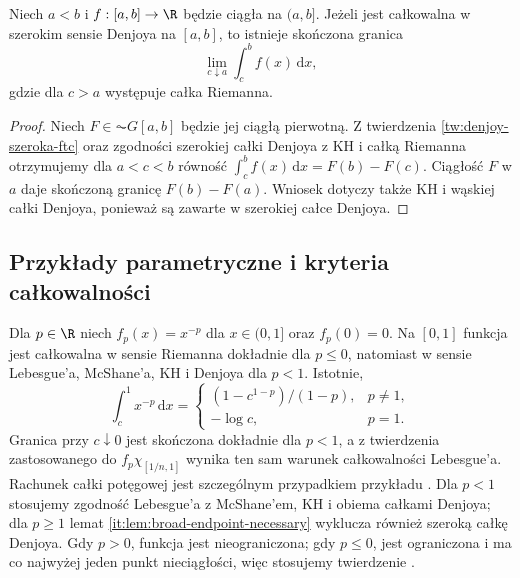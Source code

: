 \begin{lemat}\label{it:lem:broad-endpoint-necessary}
Niech $a<b$ i $f:[a,b]\to\R$ będzie ciągła na $(a,b]$. Jeżeli jest całkowalna w szerokim sensie Denjoya na $[a,b]$, to istnieje skończona granica
\[
 \lim_{c\downarrow a}\int_c^b f(x)\,\mathrm dx,
\]
gdzie dla $c>a$ występuje całka Riemanna.
\end{lemat}
\begin{proof}
Niech $F\in\AC G[a,b]$ będzie jej ciągłą pierwotną. Z twierdzenia \ref{tw:denjoy-szeroka-ftc} oraz zgodności szerokiej całki Denjoya z KH i całką Riemanna otrzymujemy dla $a<c<b$ równość $\int_c^b f(x)\,\mathrm dx=F(b)-F(c)$. Ciągłość $F$ w $a$ daje skończoną granicę $F(b)-F(a)$. Wniosek dotyczy także KH i wąskiej całki Denjoya, ponieważ są zawarte w szerokiej całce Denjoya.
\end{proof}
\subsection{Przykłady parametryczne i kryteria całkowalności}
\begin{przyklad}\label{ma1:kh:ex:positive-power}
Dla $p\in\R$ niech $f_p(x)=x^{-p}$ dla $x\in(0,1]$
oraz $f_p(0)=0$. Na $[0,1]$ funkcja jest całkowalna w sensie Riemanna dokładnie dla $p\le0$, natomiast w sensie Lebesgue'a, McShane'a, KH i Denjoya dla $p<1$. Istotnie,
\[
\int_c^1x^{-p}\,\mathrm dx=\begin{cases}(1-c^{1-p})/(1-p),&p\ne1,\\-\log c,&p=1.\end{cases}
\]
Granica przy $c\downarrow0$ jest skończona dokładnie dla $p<1$, a z twierdzenia  zastosowanego do $f_p\chi_{[1/n,1]}$ wynika ten sam warunek całkowalności Lebesgue'a. Rachunek całki potęgowej jest szczególnym przypadkiem przykładu . Dla $p<1$ stosujemy zgodność Lebesgue'a z McShane'em, KH i obiema całkami Denjoya; dla $p\ge1$ lemat \ref{it:lem:broad-endpoint-necessary} wyklucza również szeroką całkę Denjoya. Gdy $p>0$, funkcja jest nieograniczona; gdy $p\le0$, jest ograniczona i ma co najwyżej jeden punkt nieciągłości, więc stosujemy twierdzenie .
\end{przyklad}

